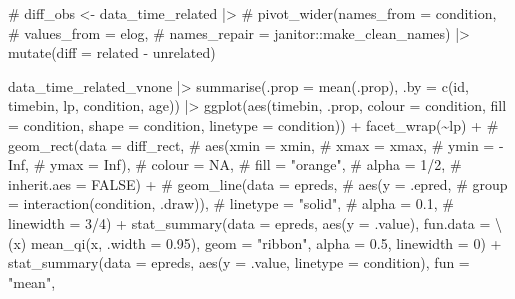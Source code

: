 \documentclass[
  letterpaper,
  DIV=11,
  numbers=noendperiod]{scrartcl}
\newenvironment{Shaded}{\begin{snugshade}}{\end{snugshade}}
\newcommand{\AttributeTok}[1]{\textcolor[rgb]{0.40,0.45,0.13}{#1}}
\newcommand{\CommentTok}[1]{\textcolor[rgb]{0.37,0.37,0.37}{#1}}
\newcommand{\DecValTok}[1]{\textcolor[rgb]{0.68,0.00,0.00}{#1}}
\newcommand{\FloatTok}[1]{\textcolor[rgb]{0.68,0.00,0.00}{#1}}
\newcommand{\FunctionTok}[1]{\textcolor[rgb]{0.28,0.35,0.67}{#1}}
\newcommand{\NormalTok}[1]{\textcolor[rgb]{0.00,0.23,0.31}{#1}}
\newcommand{\SpecialCharTok}[1]{\textcolor[rgb]{0.37,0.37,0.37}{#1}}
\newcommand{\StringTok}[1]{\textcolor[rgb]{0.13,0.47,0.30}{#1}}
\begin{document}
\begin{Shaded}
\begin{Highlighting}[]
\CommentTok{\# diff\_obs \textless{}{-} data\_time\_related |\textgreater{}}
\CommentTok{\#   pivot\_wider(names\_from = condition, }
\CommentTok{\#               values\_from = elog,}
\CommentTok{\#               names\_repair = janitor::make\_clean\_names) |\textgreater{} mutate(diff = related {-} unrelated)}

\NormalTok{data\_time\_related\_vnone }\SpecialCharTok{|\textgreater{}} 
    \FunctionTok{summarise}\NormalTok{(}\AttributeTok{.prop =} \FunctionTok{mean}\NormalTok{(.prop),}
              \AttributeTok{.by =} \FunctionTok{c}\NormalTok{(id, timebin, lp, condition, age)) }\SpecialCharTok{|\textgreater{}} 
    \FunctionTok{ggplot}\NormalTok{(}\FunctionTok{aes}\NormalTok{(timebin, .prop, }
               \AttributeTok{colour =}\NormalTok{ condition,}
               \AttributeTok{fill =}\NormalTok{ condition,}
               \AttributeTok{shape =}\NormalTok{ condition,}
               \AttributeTok{linetype =}\NormalTok{ condition)) }\SpecialCharTok{+}
    \FunctionTok{facet\_wrap}\NormalTok{(}\SpecialCharTok{\textasciitilde{}}\NormalTok{lp) }\SpecialCharTok{+}
    \CommentTok{\# geom\_rect(data = diff\_rect,}
    \CommentTok{\#         aes(xmin = xmin,}
    \CommentTok{\#           xmax = xmax,}
    \CommentTok{\#           ymin = {-}Inf,}
    \CommentTok{\#           ymax = Inf),}
    \CommentTok{\#         colour = NA,}
    \CommentTok{\#         fill = "orange",}
    \CommentTok{\#         alpha = 1/2,}
    \CommentTok{\#         inherit.aes = FALSE) +}
    \CommentTok{\# geom\_line(data = epreds,}
    \CommentTok{\#         aes(y = .epred,}
\CommentTok{\#           group = interaction(condition, .draw)),}
\CommentTok{\#         linetype = "solid",}
\CommentTok{\#         alpha = 0.1,}
\CommentTok{\#         linewidth = 3/4) +}
\FunctionTok{stat\_summary}\NormalTok{(}\AttributeTok{data =}\NormalTok{ epreds,}
             \FunctionTok{aes}\NormalTok{(}\AttributeTok{y =}\NormalTok{ .value),}
             \AttributeTok{fun.data =}\NormalTok{ \textbackslash{}(x) }\FunctionTok{mean\_qi}\NormalTok{(x, }\AttributeTok{.width =} \FloatTok{0.95}\NormalTok{),}
             \AttributeTok{geom =} \StringTok{"ribbon"}\NormalTok{,}
             \AttributeTok{alpha =} \FloatTok{0.5}\NormalTok{,}
             \AttributeTok{linewidth =} \DecValTok{0}\NormalTok{) }\SpecialCharTok{+}
    \FunctionTok{stat\_summary}\NormalTok{(}\AttributeTok{data =}\NormalTok{ epreds,}
                 \FunctionTok{aes}\NormalTok{(}\AttributeTok{y =}\NormalTok{ .value,}
                    \AttributeTok{linetype =}\NormalTok{ condition),}
                 \AttributeTok{fun =} \StringTok{"mean"}\NormalTok{,}

\end{Highlighting}
\end{Shaded}
\end{document}
